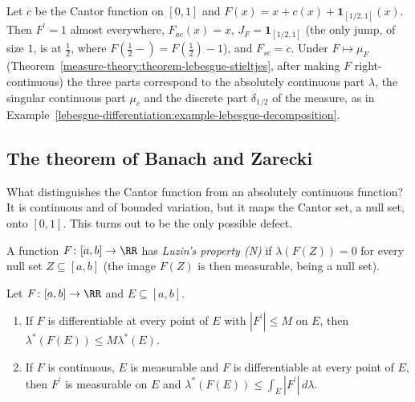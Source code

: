 \begin{example}\label{lebesgue-differentiation:example-monotone-decomposition}
Let $c$ be the Cantor function on $[0, 1]$ and $F(x) = x + c(x) + \mathbf{1}_{[1/2, 1]}(x)$. Then $F^{\prime} = 1$ almost everywhere, $F_{ac}(x) = x$, $J_F = \mathbf{1}_{[1/2, 1]}$ (the only jump, of size $1$,
is at $\frac12$, where $F(\frac12-) = F(\frac12) - 1$), and $F_{sc} = c$. Under $F \mapsto \mu_F$ (Theorem~\ref{measure-theory:theorem-lebesgue-stieltjes}, after making $F$ right-continuous) the three parts
correspond to the absolutely continuous part $\lambda$, the singular continuous part $\mu_c$ and the discrete part $\delta_{1/2}$ of the measure, as in
Example~\ref{lebesgue-differentiation:example-lebesgue-decomposition}.
\end{example}

\subsection{The theorem of Banach and Zarecki}\label{lebesgue-differentiation:subsection-banach-zarecki}

What distinguishes the Cantor function from an absolutely continuous function? It is continuous and of bounded variation, but it maps the Cantor set, a null set, onto $[0, 1]$. This turns out to be the
only possible defect.

\begin{definition}\label{lebesgue-differentiation:definition-luzin-n}
A function $F \colon [a, b] \to \RR$ has \emph{Luzin's property (N)} if $\lambda(F(Z)) = 0$ for every null set $Z \subseteq [a, b]$ (the image $F(Z)$ is then measurable, being a null set).
\end{definition}

\begin{lemma}\label{lebesgue-differentiation:lemma-image-measure-bound}
Let $F \colon [a, b] \to \RR$ and $E \subseteq [a, b]$.
\begin{enumerate}
\item If $F$ is differentiable at every point of $E$ with $|F^{\prime}| \leq M$ on $E$, then $\lambda^*(F(E)) \leq M\lambda^*(E)$.
\item If $F$ is continuous, $E$ is measurable and $F$ is differentiable at every point of $E$, then $F^{\prime}$ is measurable on $E$ and $\lambda^*(F(E)) \leq \int_E|F^{\prime}|\,d\lambda$.
\end{enumerate}
\end{lemma}

